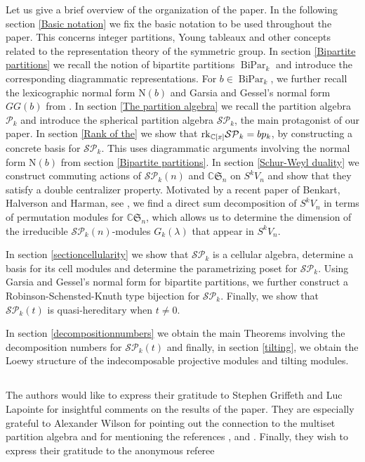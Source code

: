 \documentclass[10pt,hidelinks]{article}
\newcommand{\norm}{\text{N}}
\newcommand{\ParAlg}{{\mathcal P }_{k}}
\newcommand{\SpheAlg}{{\mathcal{SP} }_{k}}
\newcommand{\CC}{ \mathbb C }
\newcommand{\Si}{\mathfrak{S}}
\newcommand{\rank }{{ \rm rk }}
\newcommand{\BiPar}{ \operatorname{BiPar}}
\numberwithin{equation}{section}
\begin{document}
\medskip
Let us give a brief overview of the organization of the paper. In the following section
\ref{Basic notation} we fix the basic notation to be used throughout the paper. This
concerns integer partitions, Young tableaux and other concepts related to the representation
theory of the symmetric group. In section \ref{Bipartite partitions} we recall the notion
of bipartite partitions $ \BiPar_k $ and introduce the corresponding diagrammatic representations.
For $ b \in \BiPar_k$, we further recall the lexicographic normal form $ \norm(b) $ and Garsia and Gessel's
normal form $GG(b)$ from \cite{GG}. In section \ref{The partition algebra} we recall the partition
algebra $ \ParAlg$ and introduce the spherical partition algebra $ \SpheAlg$, the main protagonist of
our paper. In section \ref{Rank of the} we show that $ \rank_{\CC[x]} \SpheAlg = bp_k $,
by constructing a concrete basis for $ \SpheAlg$. This uses diagrammatic arguments
involving the normal form $\norm(b)$ from section \ref{Bipartite partitions}. 
In section \ref{Schur-Weyl duality} we construct commuting actions of $ \SpheAlg(n) $ and $ \CC \Si_n $
on $ S^k V_n $ and show that they satisfy a double centralizer property. Motivated by
a recent paper of Benkart, Halverson and Harman, see \cite{BHH}, 
we find a direct sum decomposition of $  S^k V_n $ 
in terms of permutation modules for $ \CC \Si_n $, which allows us to determine 
the dimension of the irreducible $ \SpheAlg(n) $-modules $ G_k(\lambda) $ that appear in $  S^k V_n $. 

\medskip
In section \ref{sectioncellularity} we show that $ \SpheAlg $ is a cellular algebra, determine a basis for its cell modules
and determine the parametrizing poset for $ \SpheAlg $. Using Garsia and Gessel's normal form
for bipartite partitions, we further construct a Robinson-Schensted-Knuth type bijection for 
$ \SpheAlg $. Finally, we show that $ \SpheAlg(t) $ is quasi-hereditary when $ t \neq 0$. 

\medskip
In section \ref{decompositionnumbers} we obtain the main Theorems involving the decomposition
numbers for $ \SpheAlg(t)$ and finally, in section \ref{tilting}, we obtain the Loewy structure
of the indecomposable projective modules and tilting modules. 
  

\subsection*{{\color{black}{Acknowledgements}}}
The authors would like to express their gratitude to Stephen Griffeth and Luc Lapointe for 
insightful comments on the results of the paper. They are especially grateful to Alexander Wilson for
pointing out the connection to the multiset partition algebra and for mentioning the references
\cite{NaPaulSriva}, \cite{OrellanaZabrocki2} and \cite{Wilson}.   
Finally, they wish to express their gratitude to the anonymous referee
{\color{black}{for indicating several research projects related to the present work
and for communicating detailed suggestions that helped them improve substantially the clarity and presentation
of the paper.}}
\end{document}
